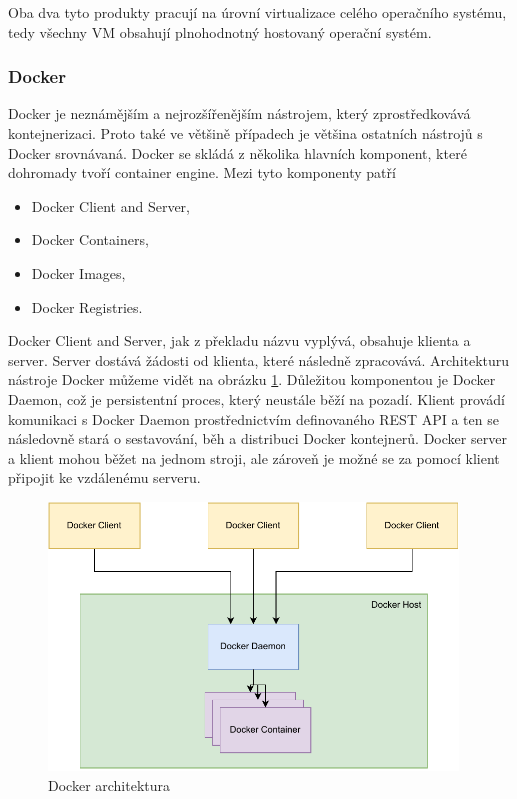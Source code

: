 Oba dva tyto produkty pracují na úrovní virtualizace celého operačního systému, tedy všechny VM obsahují plnohodnotný hostovaný operační systém.

\subsubsection{Docker} 
Docker je neznámějším a nejrozšířenějším nástrojem, který zprostředkovává kontejnerizaci. Proto také ve většině případech je většina ostatních nástrojů s Docker srovnávaná. Docker se skládá z několika hlavních komponent, které dohromady tvoří container engine. Mezi tyto komponenty patří

\begin{itemize}
    \item Docker Client and Server,
    \item Docker Containers,
    \item Docker Images,
    \item Docker Registries.
\end{itemize}

Docker Client and Server, jak z překladu názvu vyplývá, obsahuje klienta a server. Server dostává žádosti od klienta, které následně zpracovává. Architekturu nástroje Docker můžeme vidět na obrázku \ref{fig:docker_arch}. Důležitou komponentou je Docker Daemon, což je persistentní proces, který neustále běží na pozadí. Klient provádí komunikaci s Docker Daemon prostřednictvím definovaného REST API a ten se následovně stará o sestavování, běh a distribuci Docker kontejnerů. Docker server a klient mohou běžet na jednom stroji, ale zároveň je možné se za pomocí klient připojit ke vzdálenému serveru. 
\cite{turnbull2014docker}\cite{docker_overview}

\begin{figure}[htbp]
    \centering 
    \includegraphics[width=0.97\textwidth]{assets/img/docker_arch.pdf}
    \caption{Docker architektura}
    \label{fig:docker_arch}
\end{figure}

